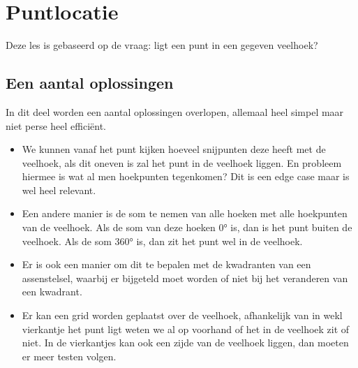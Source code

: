\documentclass[12pt,a4paper]{article}
\begin{document}
	\section{Puntlocatie}
	Deze les is gebaseerd op de vraag: ligt een punt in een gegeven veelhoek? 
	
	
	\subsection{Een aantal oplossingen}
	In dit deel worden een aantal oplossingen overlopen, allemaal heel simpel maar niet perse heel efficiënt. 
	\begin{itemize}
		\item We kunnen vanaf het punt kijken hoeveel snijpunten deze heeft met de veelhoek, als dit oneven is zal het punt in de veelhoek liggen. En probleem hiermee is wat al men hoekpunten tegenkomen? Dit is een edge case maar is wel heel relevant. 
		\item Een andere manier is de som te nemen van alle hoeken met alle hoekpunten van de veelhoek. Als de som van deze hoeken 0° is, dan is het punt buiten de veelhoek. Als de som 360° is, dan zit het punt wel in de veelhoek.
		\item Er is ook een manier om dit te bepalen met de kwadranten van een assenstelsel, waarbij er bijgeteld moet worden of niet bij het veranderen van een kwadrant. 
		\item Er kan een grid worden geplaatst over de veelhoek, afhankelijk van in wekl vierkantje het punt ligt weten we al op voorhand of het in de veelhoek zit of niet. In de vierkantjes kan ook een zijde van de veelhoek liggen, dan moeten er meer testen volgen. 
	\end{itemize}
	
\end{document}
